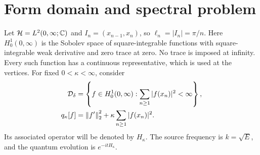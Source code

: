 \section{Form domain and spectral problem}
\label{sec:forms}

Let $\mathcal{H}=L^2(0,\infty;\mathbb{C})$ and
$I_n=(x_{n-1},x_n)$, so $\ell_n=|I_n|=\pi/n$.
Here $H^1_0(0,\infty)$ is the Sobolev space of square-integrable
functions with square-integrable weak derivative and zero trace at
zero. No trace is imposed at infinity.
Every such function has a continuous representative, which is used
at the vertices.
For fixed $0<\kappa<\infty$, consider
\begin{align}
\mathcal{D}_\delta
 &=\left\{f\in H^1_0(0,\infty):
                  \sum_{n\ge1}|f(x_n)|^2<\infty\right\},\notag\\
q_\kappa[f]
 &=\left\lVert f'\right\rVert_2^2+\kappa\sum_{n\ge1}|f(x_n)|^2.
\label{eq:delta-form}
\end{align}
Its associated operator will be denoted by $H_\kappa$.
The source frequency is $k=\sqrt E$, and the quantum evolution is
$e^{-itH_\kappa}$.

